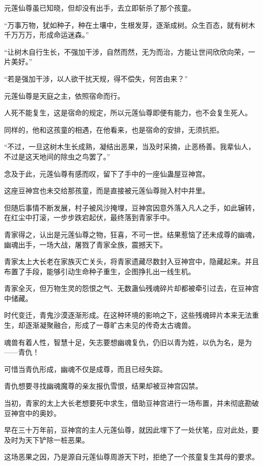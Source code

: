 \begin{this_body}
元莲仙尊虽已知晓，但却没有出手，去立即斩杀了那个孩童。

“万事万物，犹如种子，种在土壤中，生根发芽，逐渐成树。众生百态，就有树木千万万万，形成命运迷森。”

“让树木自行生长，不强加干涉，自然而然，无为而治，方能让世间欣欣向荣，一片美好。”

“若是强加干涉，以人欲干扰天规，得不偿失，何苦由来？”

元莲仙尊是天庭之主，依照宿命而行。

人死不能复生，这是宿命的规定，所以元莲仙尊即便有能力，也不会复生死人。

同样的，他和这孩童的相遇，在他看来，也是宿命的安排，无须抗拒。

“不过，一旦这树木生长成熟，凝结出恶果，当及时采摘，止恶杨善。我辈仙人，不过是这天地间的除虫之鸟罢了。”

念及于此，元莲仙尊有感而叹，留下了手中的一座仙蛊屋豆神宫。

这座豆神宫也未交给那孩童，而是直接被元莲仙尊抛入村中井里。

但随后事情不断发展，村子被风沙掩埋，豆神宫因意外落入凡人之手，如此辗转，在红尘中打滚，一步步跌宕起伏，最终落到青家手中。

青家得之，认出是元莲仙尊之物，狂喜，不可一世。结果惹恼了还未成尊的幽魂，幽魂出手，一场大战，屠戮了青家全族，震撼天下。

青家太上大长老在家族灭亡关头，将青家遗藏尽数封入豆神宫中，隐藏起来。并且布置了手段，能够引动生命种子重生，企图挣扎出一线生机。

青家全灭，但万物生灵的怨恨之气、无数蛊仙残魂碎片却都被牵引过去，在豆神宫中储藏。

时代变迁，青鬼沙漠逐渐形成。在这种环境的影响之下，这些残魂碎片本来无法重生，却逐渐凝聚融合，形成了一尊旷古未见的传奇太古魂兽。

魂兽有着人性，智慧十足，矢志要想幽魂复仇，仍旧以青为姓，以仇为名，是为——青仇！

可惜当青仇形成，幽魂不仅是成尊，而且已经失踪。

青仇想要寻找幽魂魔尊的亲友报仇雪恨，结果却被豆神宫囚禁。

当初，青家的太上大长老想要死中求生，借助豆神宫进行一场布置，并未彻底勘破豆神宫中的奥妙。

早在三十万年前，豆神宫的主人元莲仙尊，就因此埋下了一处伏笔，应对此处，要及时为天下铲除一桩恶果。

这场恶果之因，乃是源自元莲仙尊周游天下时，拒绝了一个孩童复生其母的要求。


\end{this_body}
